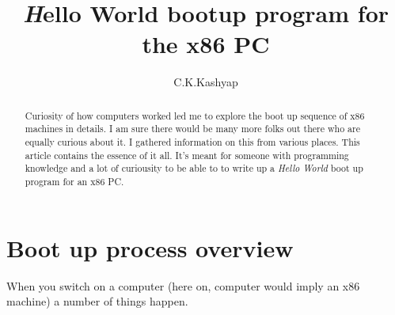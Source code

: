 \documentclass{article}
\begin{document}
\title{{\emph Hello World} bootup program for the x86 PC}
\author{C.K.Kashyap}
\maketitle

\begin{abstract}
Curiosity of how computers worked led me to explore the boot up sequence of x86
machines in details. I am sure there would be many more folks out there who are
equally curious about it. I gathered information on this from various places.
This article contains the essence of it all. It's meant for someone with
programming knowledge and a lot of curiousity to be able to to write up a
{\it Hello World} boot up program for an x86 PC.
\end{abstract}
\section*{Boot up process overview}
When you switch on a computer (here on, computer would imply an x86 machine) a number of things happen.
\end{document}
